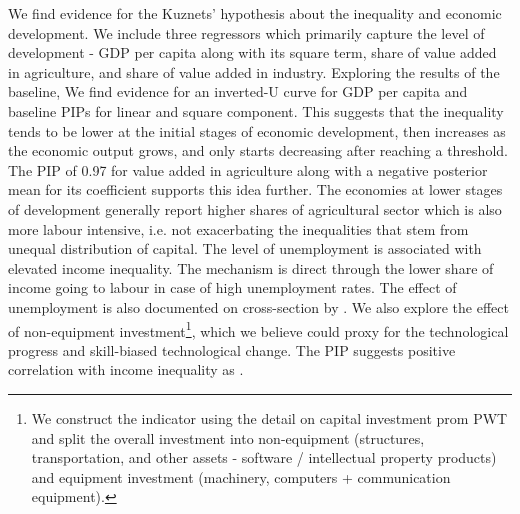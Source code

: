 \begin{refsection}
We find evidence for the Kuznets' hypothesis about the inequality and economic development. We include three regressors which primarily capture the level of development - GDP per capita along with its square term, share of value added in agriculture, and share of value added in industry. Exploring the results of the baseline, We find evidence for an inverted-U curve for GDP per capita and baseline \acp{PIP} for linear and square component. This suggests that the inequality tends to be lower at the initial stages of economic development, then increases as the economic output grows, and only starts decreasing after reaching a threshold. The \ac{PIP} of 0.97 for value added in agriculture along with a negative posterior mean for its coefficient supports this idea further. The economies at lower stages of development generally report higher shares of agricultural sector which is also more labour intensive, i.e. not exacerbating the inequalities that stem from unequal distribution of capital. The level of unemployment is associated with elevated income inequality. The mechanism is direct through the lower share of income going to labour in case of high unemployment rates. The effect of unemployment is also documented on cross-section by \textcite{furceri2019robust}. We also explore the effect of non-equipment investment\footnote{We construct the indicator using the detail on capital investment prom \ac{PWT} and split the overall investment into non-equipment (structures, transportation, and other assets - software / intellectual property products) and equipment investment (machinery, computers + communication equipment).}, which we believe could proxy for the technological progress and skill-biased technological change. The \ac{PIP} suggests positive correlation with income inequality as \textcite{goldin2009race,dabla2015causes}.


\end{refsection}
